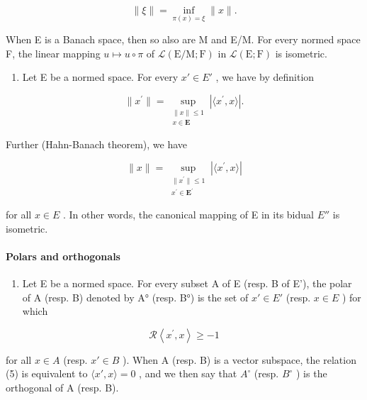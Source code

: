 \[
\| \xi \| = \inf _ {\pi (x) = \xi} \| x \|.\tag{2}
\]

When E is a Banach space, then so also are M and E/M. For every normed space F, the linear mapping \(u \mapsto u \circ \pi\) of \(\mathcal{L}(\mathrm{E}/\mathrm{M}; \mathrm{F})\) in \(\mathcal{L}(\mathrm{E}; \mathrm{F})\) is isometric.

\begin{enumerate}
\def\labelenumi{\arabic{enumi})}
\setcounter{enumi}{3}
\tightlist
\item
  Let E be a normed space. For every \(x' \in E'\) , we have by definition
\end{enumerate}

\[
\| x^{\prime}\| = \sup_{\substack{\| x\| \leqslant 1\\ x\in \mathbf{E}}}\left|\langle x^{\prime},x\rangle \right|.\tag{3}
\]

Further (Hahn-Banach theorem), we have

\[
\| x \| = \sup_{\substack{\| x^{\prime}\| \leqslant 1\\ x^{\prime}\in \mathbf{E}^{\prime}}}\left|\langle x^{\prime},x\rangle \right|\tag{4}
\]

for all \(x \in E\) . In other words, the canonical mapping of E in its bidual \(E''\) is isometric.
\relax{}
\paragraph{Polars and orthogonals}

\begin{enumerate}
\def\labelenumi{\arabic{enumi})}
\setcounter{enumi}{4}
\tightlist
\item
  Let E be a normed space. For every subset A of E (resp. B of E'), the polar of A (resp. B) denoted by A° (resp. B°) is the set of \(x' \in E'\) (resp. \(x \in E\) ) for which
\end{enumerate}

\[
\mathcal {R} \left<   x ^ {\prime}, x \right> \geqslant - 1\tag{5}
\]

for all \(x \in A\) (resp. \(x' \in B\) ). When A (resp. B) is a vector subspace, the relation (5) is equivalent to \(\langle x', x \rangle = 0\) , and we then say that \(A^{\circ}\) (resp. \(B^{\circ}\) ) is the orthogonal of A (resp. B).

